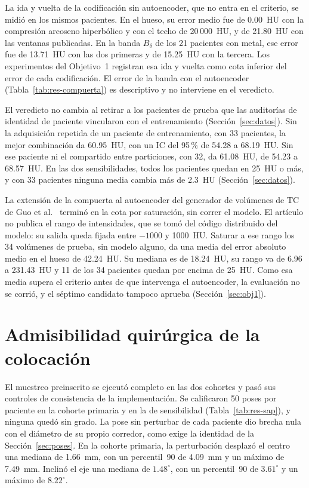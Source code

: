 La ida y vuelta de la codificación sin autoencoder, que no entra en el criterio, se midió en los mismos pacientes. En el hueso, su error medio fue de 0.00~HU con la compresión arcoseno hiperbólico y con el techo de 20\,000~HU, y de 21.80~HU con las ventanas publicadas. En la banda $B_{\delta}$ de los 21 pacientes con metal, ese error fue de 13.71~HU con las dos primeras y de 15.25~HU con la tercera. Los experimentos del Objetivo~1 registran esa ida y vuelta como cota inferior del error de cada codificación. El error de la banda con el autoencoder (Tabla~\ref{tab:res-compuerta}) es descriptivo y no interviene en el veredicto.

El veredicto no cambia al retirar a los pacientes de prueba que las auditorías de identidad de paciente vincularon con el entrenamiento (Sección~\ref{sec:datos}). Sin la adquisición repetida de un paciente de entrenamiento, con 33 pacientes, la mejor combinación da 60.95~HU, con un IC del 95\,\% de 54.28 a 68.19~HU. Sin ese paciente ni el compartido entre particiones, con 32, da 61.08~HU, de 54.23 a 68.57~HU. En las dos sensibilidades, todos los pacientes quedan en 25~HU o más, y con 33 pacientes ninguna media cambia más de 2.3~HU (Sección~\ref{sec:datos}).

La extensión de la compuerta al autoencoder del generador de volúmenes de TC de Guo et al.~\cite{guo2025maisi} terminó en la cota por saturación, sin correr el modelo. El artículo no publica el rango de intensidades, que se tomó del código distribuido del modelo: su salida queda fijada entre $-1000$ y 1000~HU. Saturar a ese rango los 34 volúmenes de prueba, sin modelo alguno, da una media del error absoluto medio en el hueso de 42.24~HU. Su mediana es de 18.24~HU, su rango va de 6.96 a 231.43~HU y 11 de los 34 pacientes quedan por encima de 25~HU. Como esa media supera el criterio antes de que intervenga el autoencoder, la evaluación no se corrió, y el séptimo candidato tampoco aprueba (Sección~\ref{sec:obj1}).

\section{Admisibilidad quirúrgica de la colocación}\label{sec:res-obj2}

El muestreo preinscrito se ejecutó completo en las dos cohortes y pasó sus controles de consistencia de la implementación. Se calificaron 50 poses por paciente en la cohorte primaria y en la de sensibilidad (Tabla~\ref{tab:res-sap}), y ninguna quedó sin grado. La pose sin perturbar de cada paciente dio brecha nula con el diámetro de su propio corredor, como exige la identidad de la Sección~\ref{sec:poses}. En la cohorte primaria, la perturbación desplazó el centro una mediana de 1.66~mm, con un percentil~90 de 4.09~mm y un máximo de 7.49~mm. Inclinó el eje una mediana de $1.48^{\circ}$, con un percentil~90 de $3.61^{\circ}$ y un máximo de $8.22^{\circ}$.

